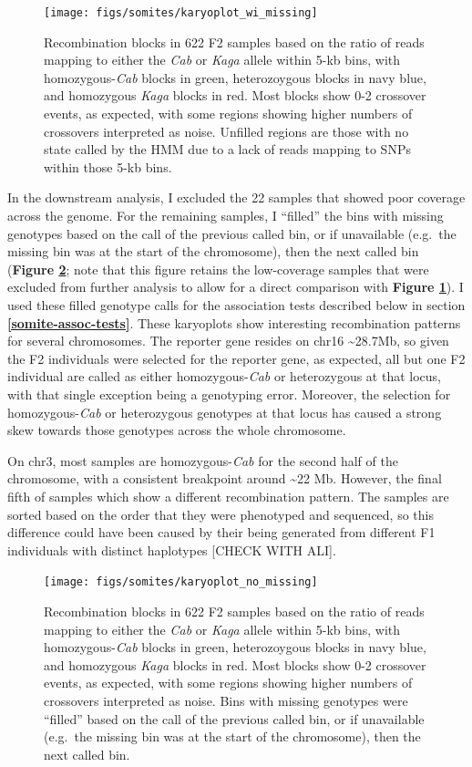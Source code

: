 \documentclass[
]{book}
\begin{document}
\begin{figure}
\texttt{[image: figs/somites/karyoplot\_wi\_missing]} \caption{Recombination blocks in 622 F2 samples based on the ratio of reads mapping to either the \emph{Cab} or \emph{Kaga} allele within 5-kb bins, with homozygous-\emph{Cab} blocks in green, heterozoygous blocks in navy blue, and homozygous \emph{Kaga} blocks in red. Most blocks show 0-2 crossover events, as expected, with some regions showing higher numbers of crossovers interpreted as noise. Unfilled regions are those with no state called by the HMM due to a lack of reads mapping to SNPs within those 5-kb bins.}\label{fig:karyo-wi-missing}
\end{figure}

In the downstream analysis, I excluded the 22 samples that showed poor coverage across the genome. For the remaining samples, I ``filled'' the bins with missing genotypes based on the call of the previous called bin, or if unavailable (e.g.~the missing bin was at the start of the chromosome), then the next called bin (\textbf{Figure \ref{fig:karyo-no-missing}}; note that this figure retains the low-coverage samples that were excluded from further analysis to allow for a direct comparison with \textbf{Figure \ref{fig:karyo-wi-missing}}). I used these filled genotype calls for the association tests described below in section \textbf{\ref{somite-assoc-tests}}. These karyoplots show interesting recombination patterns for several chromosomes. The reporter gene resides on chr16 \textasciitilde28.7Mb, so given the F2 individuals were selected for the reporter gene, as expected, all but one F2 individual are called as either homozygous-\emph{Cab} or heterozygous at that locus, with that single exception being a genotyping error. Moreover, the selection for homozygous-\emph{Cab} or heterozygous genotypes at that locus has caused a strong skew towards those genotypes across the whole chromosome.

On chr3, most samples are homozygous-\emph{Cab} for the second half of the chromosome, with a consistent breakpoint around \textasciitilde22 Mb. However, the final fifth of samples which show a different recombination pattern. The samples are sorted based on the order that they were phenotyped and sequenced, so this difference could have been caused by their being generated from different F1 individuals with distinct haplotypes {[}CHECK WITH ALI{]}.



\begin{figure}
\texttt{[image: figs/somites/karyoplot\_no\_missing]} \caption{Recombination blocks in 622 F2 samples based on the ratio of reads mapping to either the \emph{Cab} or \emph{Kaga} allele within 5-kb bins, with homozygous-\emph{Cab} blocks in green, heterozoygous blocks in navy blue, and homozygous \emph{Kaga} blocks in red. Most blocks show 0-2 crossover events, as expected, with some regions showing higher numbers of crossovers interpreted as noise. Bins with missing genotypes were ``filled'' based on the call of the previous called bin, or if unavailable (e.g.~the missing bin was at the start of the chromosome), then the next called bin.}\label{fig:karyo-no-missing}
\end{figure}
\end{document}
